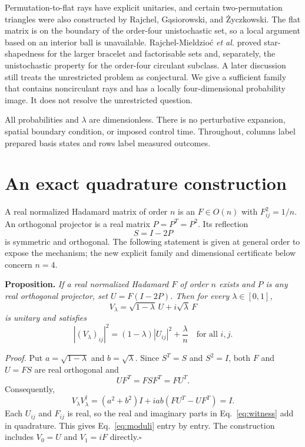 \documentclass[aip,jmp,preprint]{revtex4-2}
\begin{document}
Permutation-to-flat rays have explicit unitaries, and certain two-permutation triangles were also constructed by Rajchel, G\k{a}siorowski, and \.{Z}yczkowski.\cite{Rajchel2018} The flat matrix is on the boundary of the order-four unistochastic set,\cite{Bengtsson2005} so a local argument based on an interior ball is unavailable. Rajchel-Mieldzio\'c \emph{et al.} proved star-shapedness for the larger bracelet and factorisable sets and, separately, the unistochastic property for the order-four circulant subclass.\cite{RajchelMieldzioc2022} A later discussion still treats the unrestricted problem as conjectural.\cite{Salazar2026} We give a sufficient family that contains noncirculant rays and has a locally four-dimensional probability image. It does not resolve the unrestricted question.

All probabilities and $\lambda$ are dimensionless. There is no perturbative expansion, spatial boundary condition, or imposed control time. Throughout, columns label prepared basis states and rows label measured outcomes.

\section{An exact quadrature construction}

A real normalized Hadamard matrix of order $n$ is an $F\in O(n)$ with $F_{ij}^2=1/n$. An orthogonal projector is a real matrix $P=P^T=P^2$. Its reflection
\begin{equation}
 S=I-2P
 \label{eq:reflection}
\end{equation}
is symmetric and orthogonal. The following statement is given at general order to expose the mechanism; the new explicit family and dimensional certificate below concern $n=4$.

\noindent\textbf{Proposition.} \emph{If a real normalized Hadamard $F$ of order $n$ exists and $P$ is any real orthogonal projector, set $U=F(I-2P)$. Then for every $\lambda\in[0,1]$,
\begin{equation}
 V_\lambda=\sqrt{1-\lambda}\,U+i\sqrt{\lambda}\,F
 \label{eq:witness}
\end{equation}
is unitary and satisfies
\begin{equation}
 |(V_\lambda)_{ij}|^2=(1-\lambda)|U_{ij}|^2+\frac{\lambda}{n}
 \quad\text{for all }i,j.
 \label{eq:moduli}
\end{equation}}

\noindent\emph{Proof.} Put $a=\sqrt{1-\lambda}$ and $b=\sqrt\lambda$. Since $S^T=S$ and $S^2=I$, both $F$ and $U=FS$ are real orthogonal and
\begin{equation}
 UF^T=FSF^T=FU^T .
 \label{eq:commute}
\end{equation}
Consequently,
\begin{equation}
 V_\lambda V_\lambda^\dagger=(a^2+b^2)I+iab(FU^T-UF^T)=I .
 \label{eq:unitarity}
\end{equation}
Each $U_{ij}$ and $F_{ij}$ is real, so the real and imaginary parts in Eq.~\eqref{eq:witness} add in quadrature. This gives Eq.~\eqref{eq:moduli} entry by entry. The construction includes $V_0=U$ and $V_1=iF$ directly.\hfill$\square$
\end{document}
